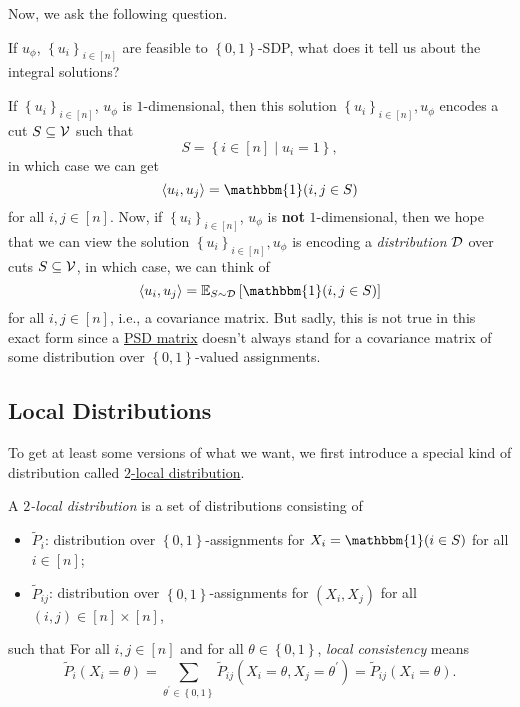 Now, we ask the following question.

\begin{problem*}
	If \(u_\phi \), \(\left\{ u_{i}  \right\} _{i\in [n]}\) are feasible to \(\left\{ 0, 1 \right\} \)-SDP, what does it tell us about the integral solutions?
\end{problem*}
\begin{answer}
	If \(\left\{ u_i \right\} _{i\in [n]}\), \(u_\phi \) is \(1\)-dimensional, then this solution \(\left\{ u_i \right\} _{i\in [n]}, u_\phi\) encodes a cut \(S \subseteq \mathcal{\MakeUppercase{v}} \) such that
	\[
		S = \left\{ i\in [n] \mid u_i = 1 \right\},
	\]
	in which case we can get
	\[
		\left\langle u_i, u_j \right\rangle = \mathbbm{1}(i, j\in S)
	\]
	for all \(i, j\in [n]\). Now, if \(\left\{ u_i \right\} _{i\in [n]}\), \(u_\phi \) is \textbf{not} \(1\)-dimensional, then we hope that we can view the solution \(\left\{ u_i \right\} _{i\in [n]}, u_\phi \) is encoding a \emph{distribution} \(\mathcal{\MakeUppercase{d}} \) over cuts \(S \subseteq \mathcal{\MakeUppercase{v}} \), in which case, we can think of
	\[
		\left\langle u_i, u_j \right\rangle = \mathbb{E}_{S\sim \mathcal{\MakeUppercase{D}} }\left[ \mathbbm{1}(i, j\in S)\right]
	\]
	for all \(i, j\in [n]\), i.e., a covariance matrix. But sadly, this is not true in this exact form since a \hyperref[def:PSD]{PSD matrix} doesn't always stand for a covariance matrix of some distribution over \(\left\{ 0, 1 \right\} \)-valued assignments.
\end{answer}

\subsection{Local Distributions}
To get at least some versions of what we want, we first introduce a special kind of distribution called \hyperref[def:2-local-distribution]{\(2\)-local distribution}.

\begin{definition}\label{def:2-local-distribution}
	A \emph{\(2\)-local distribution} is a set of distributions consisting of
	\begin{itemize}
		\item \(\widetilde{P} _i\): distribution over \(\left\{ 0, 1 \right\} \)-assignments for \(X_i= \mathbbm{1}(i\in S) \) for all \(i\in [n]\);
		\item \(\widetilde{P} _{ij}\): distribution over \(\left\{ 0, 1 \right\} \)-assignments for \((X_i, X_j)\) for all \((i, j)\in [n]\times [n]\),
	\end{itemize}
	such that For all \(i, j\in [n]\) and for all \(\theta \in \left\{ 0, 1 \right\} \), \emph{local consistency} means
	\[
		\widetilde{P} _i(X_i = \theta ) = \sum_{\theta ^\prime \in \left\{ 0, 1 \right\} } \widetilde{P} _{ij}(X_i=\theta , X_j = \theta ^\prime )= \widetilde{P} _{ij}(X_i = \theta ).
	\]
\end{definition}


